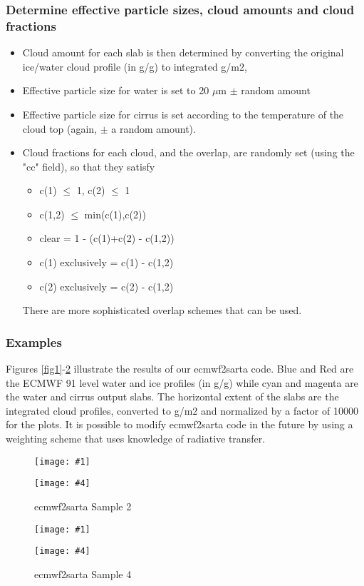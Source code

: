 \documentclass[11pt]{article}
\makeatletter
\newcommand{\ecmwfXsarta}{\textsf{ecmwf2sarta}\xspace}
\newcommand{\ecmwf}{\textsf{ECMWF}\xspace}
\newcommand{\dfigure}[6]
{
\begin{figure}
  \begin{minipage}[t]{0.47\textwidth}
  \centering
  \texttt{[image: \#1]}
   \caption{#2}  \label{#3}
  \end{minipage}
  \hfil
  \begin{minipage}[t]{0.47\linewidth}
  \centering
  \texttt{[image: \#4]}
   \caption{#5}  \label{#6}
  \end{minipage}
\end{figure}
}
\renewcommand{\section}{\@startsection {section}{1}{\z@}%
                                   {-3.5ex \@plus -1ex \@minus -.2ex}%
                                   {2.3ex \@plus.2ex}%
                                   {\reset@font\large\bfseries}}
\makeatother
\begin{document}
\subsubsection{Determine effective particle sizes, cloud amounts and
  cloud fractions}
\begin{itemize}
\item Cloud amount for each slab is then determined by converting the
  original ice/water cloud profile (in g/g) to integrated g/m2,
\item Effective particle size for water is set to 20 $\mu$m $\pm$ random
  amount
\item Effective particle size for cirrus is set according to the
  temperature of the cloud top (again, $\pm$ a random amount).
\item Cloud fractions for each cloud, and the overlap, are randomly set
  (using the "cc" field), so that they satisfy
  \begin{itemize}
  \item c(1) $\le$ 1, c(2) $\le$ 1
  \item c(1,2) $\le$ min(c(1),c(2))
  \item clear = 1 - (c(1)+c(2) - c(1,2))
  \item c(1) exclusively = c(1) - c(1,2)
  \item c(2) exclusively = c(2) - c(1,2)
  \end{itemize}
There are more sophisticated overlap schemes that can be used.
\end{itemize}

\subsubsection{Examples}
Figures \ref{fig1}-\ref{fig4} illustrate the results of our
\ecmwfXsarta code. Blue and Red are the \ecmwf 91 level water
and ice profiles (in g/g) while cyan and magenta are the water and
cirrus output slabs.  The horizontal extent of the slabs are
the integrated cloud profiles, converted to g/m2 and normalized by a
factor of 10000 for the plots. It is possible to modify
\ecmwfXsarta code in the future by using a weighting scheme
that uses knowledge of radiative transfer.

\dfigure{Figs/clouds_profile10.eps}{\ecmwfXsarta Sample
  1}{fig1}{Figs/clouds_profile100.eps}{\ecmwfXsarta Sample
  2}{fig2} \dfigure{Figs/clouds_profile1000.eps}{\ecmwfXsarta
  Sample 3}{fig3}{Figs/clouds_profile2000.eps}{\ecmwfXsarta
  Sample 4}{fig4}

\end{document}
